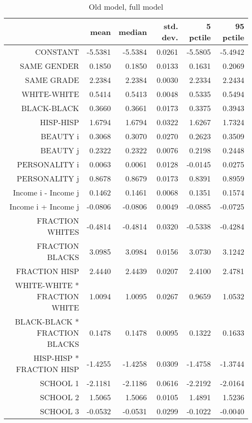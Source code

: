 \begin{table}[ht]
\caption{Old model, full model}
\centering
\begin{tabular}{rrrrrr}
  \hline
 & mean & median & std. dev. & 5 pctile & 95 pctile \\ 
  \hline
CONSTANT & -5.5381 & -5.5384 & 0.0261 & -5.5805 & -5.4942 \\ 
  SAME GENDER & 0.1850 & 0.1850 & 0.0133 & 0.1631 & 0.2069 \\ 
  SAME GRADE & 2.2384 & 2.2384 & 0.0030 & 2.2334 & 2.2434 \\ 
  WHITE-WHITE & 0.5414 & 0.5413 & 0.0048 & 0.5335 & 0.5494 \\ 
  BLACK-BLACK & 0.3660 & 0.3661 & 0.0173 & 0.3375 & 0.3943 \\ 
  HISP-HISP & 1.6794 & 1.6794 & 0.0322 & 1.6267 & 1.7324 \\ 
  BEAUTY i & 0.3068 & 0.3070 & 0.0270 & 0.2623 & 0.3509 \\ 
  BEAUTY j & 0.2322 & 0.2322 & 0.0076 & 0.2198 & 0.2448 \\ 
  PERSONALITY i & 0.0063 & 0.0061 & 0.0128 & -0.0145 & 0.0275 \\ 
  PERSONALITY j & 0.8678 & 0.8679 & 0.0173 & 0.8391 & 0.8959 \\ 
  Income i - Income j & 0.1462 & 0.1461 & 0.0068 & 0.1351 & 0.1574 \\ 
  Income i + Income j & -0.0806 & -0.0806 & 0.0049 & -0.0885 & -0.0725 \\ 
  FRACTION WHITES & -0.4814 & -0.4814 & 0.0320 & -0.5338 & -0.4284 \\ 
  FRACTION BLACKS & 3.0985 & 3.0984 & 0.0156 & 3.0730 & 3.1242 \\ 
  FRACTION HISP & 2.4440 & 2.4439 & 0.0207 & 2.4100 & 2.4781 \\ 
  WHITE-WHITE * FRACTION WHITE & 1.0094 & 1.0095 & 0.0267 & 0.9659 & 1.0532 \\ 
  BLACK-BLACK * FRACTION BLACKS & 0.1478 & 0.1478 & 0.0095 & 0.1322 & 0.1633 \\ 
  HISP-HISP * FRACTION HISP & -1.4255 & -1.4258 & 0.0309 & -1.4758 & -1.3744 \\ 
  SCHOOL 1 & -2.1181 & -2.1186 & 0.0616 & -2.2192 & -2.0164 \\ 
  SCHOOL 2 & 1.5065 & 1.5066 & 0.0105 & 1.4891 & 1.5236 \\ 
  SCHOOL 3 & -0.0532 & -0.0531 & 0.0299 & -0.1022 & -0.0040 \\ 

\end{tabular}
\end{table}

